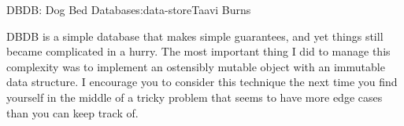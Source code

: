 \begin{aosachapter}{DBDB: Dog Bed Database}{s:data-store}{Taavi Burns}
\label{summary}

DBDB is a simple database that makes simple guarantees, and yet things
still became complicated in a hurry. The most important thing I did to
manage this complexity was to implement an ostensibly mutable object
with an immutable data structure. I encourage you to consider this
technique the next time you find yourself in the middle of a tricky
problem that seems to have more edge cases than you can keep track of.

\end{aosachapter}
